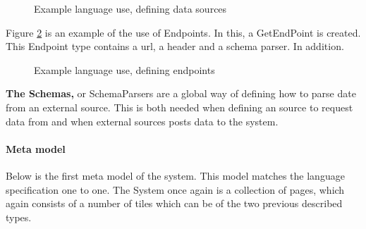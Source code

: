 \begin{figure}
\begin{center}

\end{center}
\caption{Example language use, defining data sources}
\label{fig:exampleDatasources}
\end{figure}

Figure \ref{fig:exampleEndpoints} is an example of the use of Endpoints.
In this, a GetEndPoint is created. This Endpoint type contains a url, a header and a schema parser.
In addition.


\begin{figure}
\begin{center}

\end{center}
\caption{Example language use, defining endpoints}
\label{fig:exampleEndpoints}
\end{figure}


\textbf{The Schemas,} or SchemaParsers are a global way of defining how to parse date from an external source.
This is both needed when defining an source to request data from and when external sources posts data to the system.




\paragraph{Meta model}
Below is the first meta model of the system. 
This model matches the language specification one to one. 
The System once again is a collection of pages, which again consists of a number of tiles which can be of the two previous described types. 

